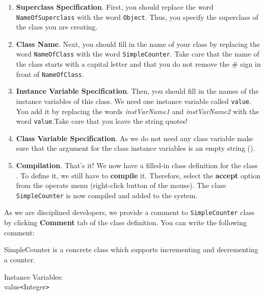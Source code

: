 \begin{enumerate}
\item \textbf{Superclass Specification}. First, you should replace
the word \texttt{NameOfSuperclass} with the word \texttt{Object}. Thus, you specify the superclass of the class you are
creating. 

\item \textbf{Class Name}. Next, you should fill in the name of
your class by replacing the word \texttt{NameOfClass} with the
word \texttt{SimpleCounter}. Take care that the name of the class
starts with a capital letter and that you do not remove the \#
sign in front of \texttt{NameOfClass}.

\item \textbf{Instance Variable Specification}. Then, you should
fill in the names of the instance variables of this class. We need
one instance variable called \texttt{value}. You add it by
replacing the words \textit{instVarName1} and
\textit{instVarName2} with the word \texttt{value}.Take
care that you leave the string quotes!

\item \textbf{Class Variable Specification}. As we do not need any class variable make sure that the argument  for the class instance variables is an empty string (). 

\item \textbf{Compilation}. That's it! We now have a filled-in
class definition for the class . To define it, we still have to \textbf{compile} it. Therefore,
select the \textbf{accept} option from the operate menu
(right-click button of the mouse). The class
\texttt{SimpleCounter} is now compiled and added to the system.
\end{enumerate}

As we are disciplined developers, we provide a comment to
\texttt{SimpleCounter} class by clicking \textbf{Comment} tab of
the class definition. You can write the following comment:

\begin{code}
SimpleCounter is a concrete class which supports incrementing
and decrementing a counter.

Instance Variables:\\
value\tab \texttt{<}Integer\texttt{>}
\end{code}


